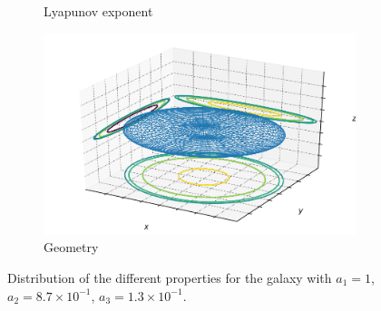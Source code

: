 \begin{figure}[h]
\begin{subfigure}[t]{0.4\textwidth}
        \caption{Lyapunov exponent}
    \end{subfigure}
    \begin{subfigure}[t]{0.4\textwidth}
        \includegraphics[width=\textwidth]{"../Files/Week 13/images/17_ellipsoid"}
        \caption{Geometry}
    \end{subfigure}
    \caption{Distribution of the different properties for the galaxy with $a_1 = 1$, $a_2 = 8.7\times10^{-1}$, $a_3 = 1.3\times10^{-1}$.}
\end{figure}


